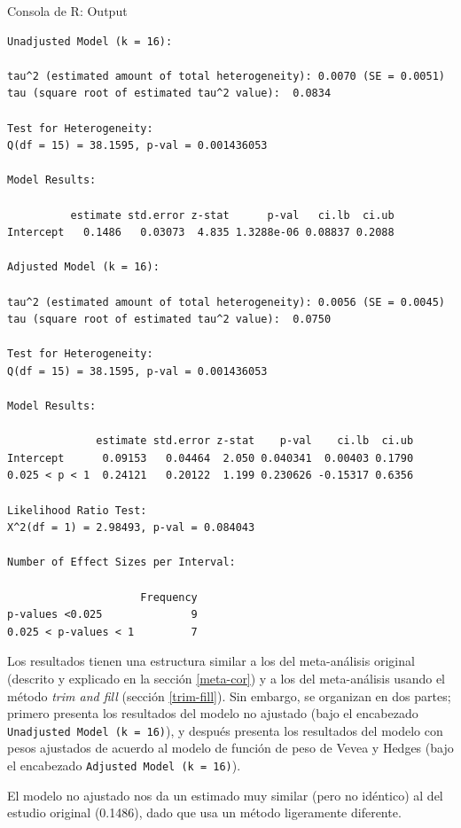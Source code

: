 \documentclass[
  bookmarksnumbered]{article}
\begin{document}
\begin{ROut}{Consola de R: Output~\thetcbcounter}
                \begin{footnotesize}
                \begin{verbatim} 
Unadjusted Model (k = 16):

tau^2 (estimated amount of total heterogeneity): 0.0070 (SE = 0.0051)
tau (square root of estimated tau^2 value):  0.0834

Test for Heterogeneity:
Q(df = 15) = 38.1595, p-val = 0.001436053

Model Results:

          estimate std.error z-stat      p-val   ci.lb  ci.ub
Intercept   0.1486   0.03073  4.835 1.3288e-06 0.08837 0.2088

Adjusted Model (k = 16):

tau^2 (estimated amount of total heterogeneity): 0.0056 (SE = 0.0045)
tau (square root of estimated tau^2 value):  0.0750

Test for Heterogeneity:
Q(df = 15) = 38.1595, p-val = 0.001436053

Model Results:

              estimate std.error z-stat    p-val    ci.lb  ci.ub
Intercept      0.09153   0.04464  2.050 0.040341  0.00403 0.1790
0.025 < p < 1  0.24121   0.20122  1.199 0.230626 -0.15317 0.6356

Likelihood Ratio Test:
X^2(df = 1) = 2.98493, p-val = 0.084043

Number of Effect Sizes per Interval:

                     Frequency
p-values <0.025              9
0.025 < p-values < 1         7
 \end{verbatim}
                \end{footnotesize}
                \end{ROut}

Los resultados tienen una estructura similar a los del meta-análisis original (descrito y explicado en la sección \ref{meta-cor}) y a los del meta-análisis usando el método \emph{trim and fill} (sección \ref{trim-fill}). Sin embargo, se organizan en dos partes; primero presenta los resultados del modelo no ajustado (bajo el encabezado \texttt{Unadjusted\ Model\ (k\ =\ 16)}), y después presenta los resultados del modelo con pesos ajustados de acuerdo al modelo de función de peso de Vevea y Hedges (bajo el encabezado \texttt{Adjusted\ Model\ (k\ =\ 16)}).

El modelo no ajustado nos da un estimado muy similar (pero no idéntico) al del estudio original (0.1486), dado que usa un método ligeramente diferente.
\end{document}
